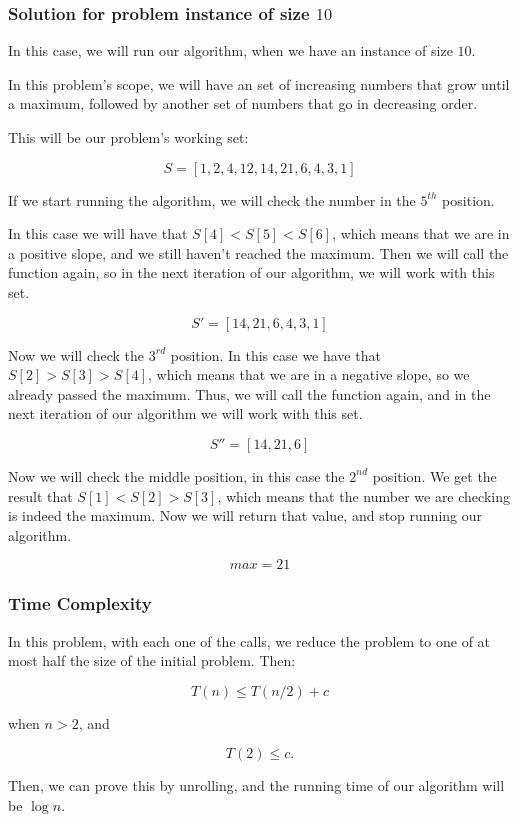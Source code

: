 \documentclass{article}
\begin{document}
\subsubsection*{Solution for problem instance of size $10$}

In this case, we will run our algorithm, when we have an instance of size $10$.

In this problem's scope, we will have an set of increasing numbers that grow until a maximum, followed by another set of numbers that go in decreasing order.

This will be our problem's working set:

$$S = [1,2,4,12,14,21,6,4,3,1]$$

If we start running the algorithm, we will check the number in the $5^{th}$ position.

In this case we will have that $S[4]<S[5]<S[6]$, which means that we are in a positive slope, and we still haven't reached the maximum. Then we will call the function again, so in the next iteration of our algorithm, we will work with this set.

$$S' = [14,21,6,4,3,1]$$

Now we will check the $3^{rd}$ position. In this case we have that $S[2]>S[3]>S[4]$, which means that we are in a negative slope, so we already passed the maximum. Thus, we will call the function again, and in the next iteration of our algorithm we will work with this set.

$$S'' = [14,21,6]$$

Now we will check the middle position, in this case the $2^{nd}$ position. We get the result that $S[1]<S[2]>S[3]$, which means that the number we are checking is indeed the maximum. Now we will return that value, and stop running our algorithm.

$$max = 21$$

\subsubsection*{Time Complexity}

In this problem, with each one of the calls, we reduce the problem to one of at most half the size of the initial problem. Then:

$$T(n)\leq T(n/2) + c$$

when $n>2$, and

$$T(2)\leq c.$$

Then, we can prove this by unrolling, and the running time of our algorithm will be $\log n$.
\end{document}
